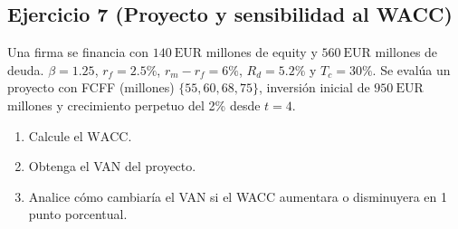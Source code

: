 \documentclass[12pt,a4paper]{article}
\newcommand{\EUR}[1]{\ensuremath{#1~\text{EUR}}}
\newenvironment{ejercicio}[1]{\subsection*{Ejercicio #1}}{}
\begin{document}
\begin{ejercicio}{7 (Proyecto y sensibilidad al WACC)}
Una firma se financia con \EUR{140} millones de equity y \EUR{560} millones de deuda. $\beta=1.25$, $r_f=2.5\%$, $r_m-r_f=6\%$, $R_d=5.2\%$ y $T_c=30\%$. Se evalúa un proyecto con FCFF (millones) $\{55,60,68,75\}$, inversión inicial de \EUR{950} millones y crecimiento perpetuo del 2\% desde $t=4$.
\begin{enumerate}[label=\alph*)]
  \item Calcule el $\text{WACC}$.
  \item Obtenga el VAN del proyecto.
  \item Analice cómo cambiaría el VAN si el WACC aumentara o disminuyera en 1 punto porcentual.
\end{enumerate}
\end{ejercicio}
\end{document}
